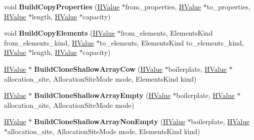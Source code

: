 \begin{DoxyCompactItemize}
\item 
void {\bfseries Build\+Copy\+Properties} (\hyperlink{classv8_1_1internal_1_1_h_value}{H\+Value} $\ast$from\+\_\+properties, \hyperlink{classv8_1_1internal_1_1_h_value}{H\+Value} $\ast$to\+\_\+properties, \hyperlink{classv8_1_1internal_1_1_h_value}{H\+Value} $\ast$length, \hyperlink{classv8_1_1internal_1_1_h_value}{H\+Value} $\ast$capacity)\hypertarget{classv8_1_1internal_1_1_h_graph_builder_acdae4dbf4695a68456c0936045d8398f}{}\label{classv8_1_1internal_1_1_h_graph_builder_acdae4dbf4695a68456c0936045d8398f}

\item 
void {\bfseries Build\+Copy\+Elements} (\hyperlink{classv8_1_1internal_1_1_h_value}{H\+Value} $\ast$from\+\_\+elements, Elements\+Kind from\+\_\+elements\+\_\+kind, \hyperlink{classv8_1_1internal_1_1_h_value}{H\+Value} $\ast$to\+\_\+elements, Elements\+Kind to\+\_\+elements\+\_\+kind, \hyperlink{classv8_1_1internal_1_1_h_value}{H\+Value} $\ast$length, \hyperlink{classv8_1_1internal_1_1_h_value}{H\+Value} $\ast$capacity)\hypertarget{classv8_1_1internal_1_1_h_graph_builder_a37b5be1f7c7022e2a76725ca868e5d90}{}\label{classv8_1_1internal_1_1_h_graph_builder_a37b5be1f7c7022e2a76725ca868e5d90}

\item 
\hyperlink{classv8_1_1internal_1_1_h_value}{H\+Value} $\ast$ {\bfseries Build\+Clone\+Shallow\+Array\+Cow} (\hyperlink{classv8_1_1internal_1_1_h_value}{H\+Value} $\ast$boilerplate, \hyperlink{classv8_1_1internal_1_1_h_value}{H\+Value} $\ast$allocation\+\_\+site, Allocation\+Site\+Mode mode, Elements\+Kind kind)\hypertarget{classv8_1_1internal_1_1_h_graph_builder_ab5295ae9645f6b3c993226674181bcee}{}\label{classv8_1_1internal_1_1_h_graph_builder_ab5295ae9645f6b3c993226674181bcee}

\item 
\hyperlink{classv8_1_1internal_1_1_h_value}{H\+Value} $\ast$ {\bfseries Build\+Clone\+Shallow\+Array\+Empty} (\hyperlink{classv8_1_1internal_1_1_h_value}{H\+Value} $\ast$boilerplate, \hyperlink{classv8_1_1internal_1_1_h_value}{H\+Value} $\ast$allocation\+\_\+site, Allocation\+Site\+Mode mode)\hypertarget{classv8_1_1internal_1_1_h_graph_builder_aa983c3ae8946fd9960bfa810d829790a}{}\label{classv8_1_1internal_1_1_h_graph_builder_aa983c3ae8946fd9960bfa810d829790a}

\item 
\hyperlink{classv8_1_1internal_1_1_h_value}{H\+Value} $\ast$ {\bfseries Build\+Clone\+Shallow\+Array\+Non\+Empty} (\hyperlink{classv8_1_1internal_1_1_h_value}{H\+Value} $\ast$boilerplate, \hyperlink{classv8_1_1internal_1_1_h_value}{H\+Value} $\ast$allocation\+\_\+site, Allocation\+Site\+Mode mode, Elements\+Kind kind)\hypertarget{classv8_1_1internal_1_1_h_graph_builder_affe37995e06f744d1786487ef8c0d119}{}\label{classv8_1_1internal_1_1_h_graph_builder_affe37995e06f744d1786487ef8c0d119}


\end{DoxyCompactItemize}
